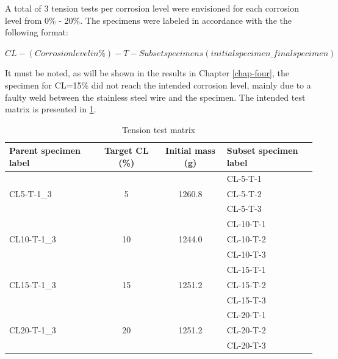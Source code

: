 A total of 3 tension tests per corrosion level were envisioned for each corrosion level from 0\% - 20\%. The specimens were labeled in accordance with the the following format:

$CL-(Corrosion level in  \%)-T-Subset specimens (initial specimen\_final specimen)$

It must be noted, as will be shown in the results in Chapter \ref{chap-four}, the specimen for CL=15\% did not reach the intended corrosion level, mainly due to a faulty weld between the stainless steel wire and the specimen. The intended test matrix is presented in \ref{tab:tension_matrix}.

\begin{table}[htbp]
\caption{Tension test matrix}
\label{tab:tension_matrix}
\centering
\begin{tabular}{lccl}
Parent specimen label        & Target CL (\%)      & Initial mass (g)        & Subset specimen label \\ \hline
\multirow{3}{*}{CL5-T-1\_3}  & \multirow{3}{*}{5}  & \multirow{3}{*}{1260.8} & CL-5-T-1              \\
                             &                     &                         & CL-5-T-2              \\
                             &                     &                         & CL-5-T-3              \\
\multirow{3}{*}{CL10-T-1\_3} & \multirow{3}{*}{10} & \multirow{3}{*}{1244.0} & CL-10-T-1             \\
                             &                     &                         & CL-10-T-2             \\
                             &                     &                         & CL-10-T-3             \\
\multirow{3}{*}{CL15-T-1\_3\*} & \multirow{3}{*}{15} & \multirow{3}{*}{1251.2} & CL-15-T-1             \\
                             &                     &                         & CL-15-T-2             \\
                             &                     &                         & CL-15-T-3             \\
\multirow{3}{*}{CL20-T-1\_3} & \multirow{3}{*}{20} & \multirow{3}{*}{1251.2} & CL-20-T-1             \\
                             &                     &                         & CL-20-T-2             \\
                             &                     &                         & CL-20-T-3            
\end{tabular}
\end{table}

